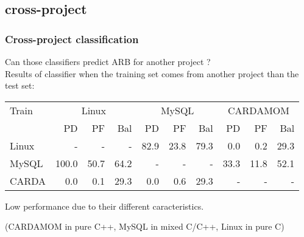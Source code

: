 \subsection{cross-project}
\begin{frame}
 \frametitle{Cross-project classification}
 \alert{Can those classifiers predict ARB for another project ?}\\
 Results of classifier when the training set comes from another project than the test set:
 \begin{center}
 \begin{tabular}{l|r r r|r r r|r r r}
  Train & \multicolumn{3}{c}{Linux} & \multicolumn{3}{c}{MySQL} & \multicolumn{3}{c}{CARDAMOM}\\
  ~ & PD & PF & Bal & PD & PF & Bal & PD & PF & Bal\\
  \hline
  Linux & - & - & - & 82.9 & 23.8 & 79.3 & 0.0 & 0.2 & 29.3\\
  MySQL & 100.0 & 50.7 & 64.2 & - & - & - & 33.3 & 11.8 & 52.1\\
  CARDA & 0.0 & 0.1 & 29.3 & 0.0 & 0.6 & 29.3 & - & - & -\\
  \hline
 \end{tabular}
 \end{center}
 Low performance due to their different caracteristics. %
 \begin{center}
  (CARDAMOM in pure C++, MySQL in mixed C/C++, Linux in pure C)
 \end{center}
\end{frame}
